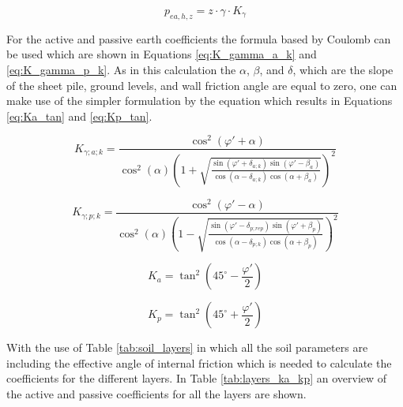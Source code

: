 \begin{equation}
    p_{ea,h,z} = z \cdot \gamma \cdot K_{\gamma}
    \label{eq:earth_pressure}
\end{equation}

For the active and passive earth coefficients the formula based by Coulomb can be used which are shown in Equations \ref{eq:K_gamma_a_k} and \ref{eq:K_gamma_p_k}. As in this calculation the $\alpha$, $\beta$, and $\delta$, which are the slope of the sheet pile, ground levels, and wall friction angle are equal to zero, one can make use of the simpler formulation by the equation which results in Equations \ref{eq:Ka_tan} and \ref{eq:Kp_tan}.

\begin{equation}
    K_{\gamma;a;k} =
    \frac{
        \cos^{2}\!\left(\varphi' + \alpha\right)
    }{
        \cos^{2}(\alpha)
        \left(
            1 +
            \sqrt{
                \frac{
                    \sin\!\left(\varphi' + \delta_{a;k}\right)
                    \sin\!\left(\varphi' - \beta_a\right)
                }{
                    \cos\!\left(\alpha - \delta_{a;k}\right)
                    \cos\!\left(\alpha + \beta_a\right)
                }
            }
        \right)^{2}
    }
    \label{eq:K_gamma_a_k}
\end{equation}

\begin{equation}
    K_{\gamma;p;k} =
    \frac{
        \cos^{2}\!\left(\varphi' - \alpha\right)
    }{
        \cos^{2}(\alpha)
        \left(
            1 -
            \sqrt{
                \frac{
                    \sin\!\left(\varphi' - \delta_{p;rep}\right)
                    \sin\!\left(\varphi' + \beta_p\right)
                }{
                    \cos\!\left(\alpha - \delta_{p;k}\right)
                    \cos\!\left(\alpha + \beta_p\right)
                }
            }
        \right)^{2}
    }
    \label{eq:K_gamma_p_k}
\end{equation}

\begin{equation}
    K_a = \tan^{2}\!\left(45^\circ - \frac{\varphi'}{2}\right)
    \label{eq:Ka_tan}
\end{equation}

\begin{equation}
    K_p = \tan^{2}\!\left(45^\circ + \frac{\varphi'}{2}\right)
    \label{eq:Kp_tan}
\end{equation}

With the use of Table \ref{tab:soil_layers} in which all the soil parameters are including the effective angle of internal friction which is needed to calculate the coefficients for the different layers. In Table \ref{tab:layers_ka_kp} an overview of the active and passive coefficients for all the layers are shown. 


